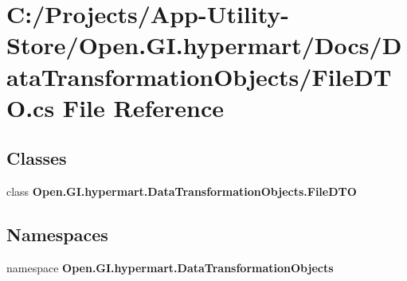 \section{C\+:/\+Projects/\+App-\/\+Utility-\/\+Store/\+Open.G\+I.\+hypermart/\+Docs/\+Data\+Transformation\+Objects/\+File\+D\+TO.cs File Reference}
\label{_file_d_t_o_8cs}
\subsection*{Classes}
\begin{DoxyCompactItemize}
\item 
class \textbf{ Open.\+G\+I.\+hypermart.\+Data\+Transformation\+Objects.\+File\+D\+TO}
\end{DoxyCompactItemize}
\subsection*{Namespaces}
\begin{DoxyCompactItemize}
\item 
namespace \textbf{ Open.\+G\+I.\+hypermart.\+Data\+Transformation\+Objects}
\end{DoxyCompactItemize}
